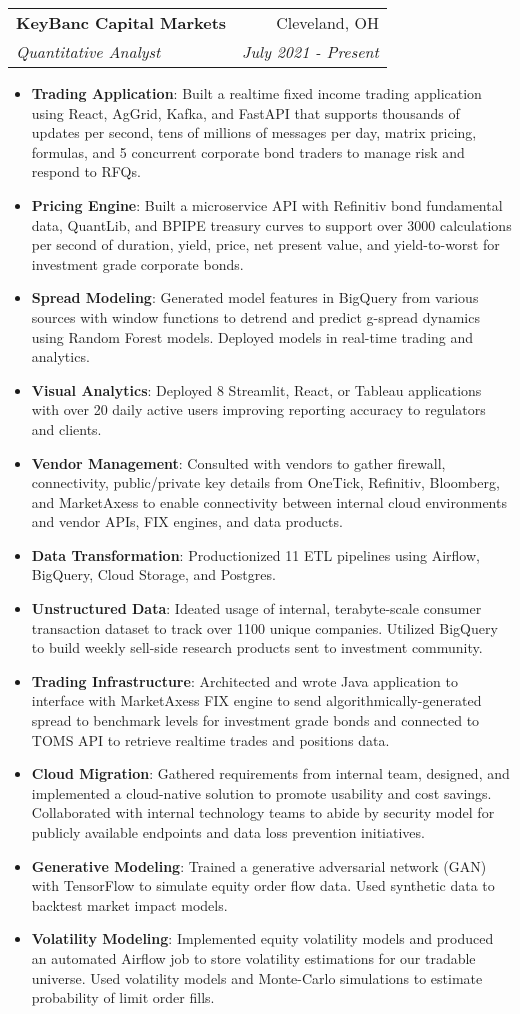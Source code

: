 \documentclass[letterpaper,11pt]{article}
\makeatletter
\newcommand{\resumeItem}[2]{
  \item\small{
    \textbf{#1}{: #2 \vspace{-2pt}}
  }
}
\newcommand{\resumeSubheading}[4]{
  \vspace{-1pt}\item
    \begin{tabular*}{0.97\textwidth}[t]{l@{\extracolsep{\fill}}r}
      \textbf{#1} & #2 \\
      \textit{\small#3} & \textit{\small #4} \\
    \end{tabular*}\vspace{-5pt}
}
\newcommand{\resumeItemListStart}{\begin{itemize}}
\newcommand{\resumeItemListEnd}{\end{itemize}\vspace{-5pt}}
\makeatother
\begin{document}
    \resumeSubheading
      {KeyBanc Capital Markets}{Cleveland, OH}
      {Quantitative Analyst}{July 2021 - Present}
      \resumeItemListStart
        \resumeItem{Trading Application}
            {Built a realtime fixed income trading application using React, AgGrid, Kafka, and FastAPI that supports thousands of updates per second, tens of millions of messages per day, matrix pricing, formulas, and 5 concurrent corporate bond traders to manage risk and respond to RFQs.}
        \resumeItem{Pricing Engine}
            {Built a microservice API with Refinitiv bond fundamental data, QuantLib, and BPIPE treasury curves to support over 3000 calculations per second of duration, yield, price, net present value, and yield-to-worst for investment grade corporate bonds.}
        \resumeItem{Spread Modeling}
            {Generated model features in BigQuery from various sources with window functions to detrend and predict g-spread dynamics using Random Forest models. Deployed models in real-time trading and analytics.}
        \resumeItem{Visual Analytics}
            {Deployed 8 Streamlit, React, or Tableau applications with over 20 daily active users improving reporting accuracy to regulators and clients.}
        \resumeItem{Vendor Management}
          {Consulted with vendors to gather firewall, connectivity, public/private key details from OneTick, Refinitiv, Bloomberg, and MarketAxess to enable connectivity between internal cloud environments and vendor APIs, FIX engines, and data products.}
        \resumeItem{Data Transformation}
            {Productionized 11 ETL pipelines using Airflow, BigQuery, Cloud Storage, and Postgres.}
        \resumeItem{Unstructured Data}
          {Ideated usage of internal, terabyte-scale consumer transaction dataset to track over 1100 unique companies. Utilized BigQuery to build weekly sell-side research products sent to investment community.}
        \resumeItem{Trading Infrastructure}
          {Architected and wrote Java application to interface with MarketAxess FIX engine to send algorithmically-generated spread to benchmark levels for investment grade bonds and connected to TOMS API to retrieve realtime trades and positions data.}
        \resumeItem{Cloud Migration}
            {Gathered requirements from internal team, designed, and implemented a cloud-native solution to promote usability and cost savings. Collaborated with internal technology teams to abide by security model for publicly available endpoints and data loss prevention initiatives.}
        \resumeItem{Generative Modeling}
            {Trained a generative adversarial network (GAN) with TensorFlow to simulate equity order flow data. Used synthetic data to backtest market impact models.}
        \resumeItem{Volatility Modeling}
            {Implemented equity volatility models and produced an automated Airflow job to store volatility estimations for our tradable universe. Used volatility models and Monte-Carlo simulations to estimate probability of limit order fills.}
      \resumeItemListEnd
\end{document}
